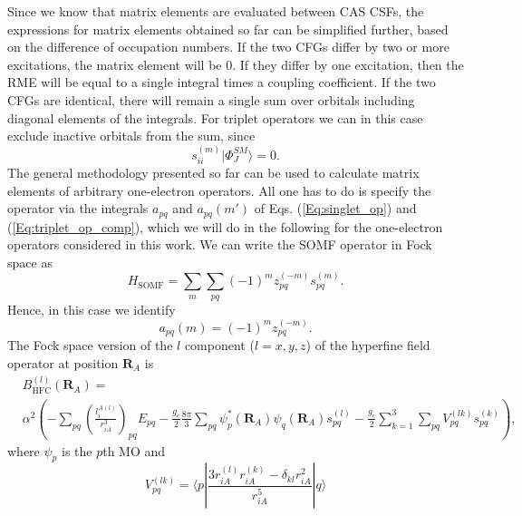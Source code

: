 Since we know that matrix elements are evaluated between CAS CSFs, the expressions for matrix elements obtained so far can be simplified further, based on the difference of occupation numbers. If the two CFGs differ by two or more excitations, the matrix element will be 0. If they differ by one excitation, then the RME will be equal to a single integral times a coupling coefficient. If the two CFGs are identical, there will remain a single sum over orbitals including diagonal elements of the integrals. For triplet operators we can in this case exclude inactive orbitals from the sum, since
	\begin{equation}s_{ii}^{(m)}|\Phi _J^{SM}\rangle  = 0.
	\end{equation} 	
The general methodology presented so far can be used to calculate matrix elements of arbitrary one-electron operators. All one has to do is specify the operator via the integrals ${a_{pq}}$ and ${a_{pq}}(m')$ of Eqs. (\ref{Eq:singlet_op}) and (\ref{Eq:triplet_op_comp}), which we will do in the following for the one-electron operators considered in this work.
We can write the SOMF operator in Fock space as
	\begin{equation}{H_{{\text{SOMF}}}} = \sum\limits_m {\sum\limits_{pq} {{{( - 1)}^m}z_{pq}^{( - m)}} } s_{pq}^{(m)}.
	\end{equation}	
Hence, in this case we identify
	\begin{equation}
	\label{Eq:integral_SOC}
	{a_{pq}}(m) = {( - 1)^m}z_{pq}^{( - m)}.
	\end{equation} 	
The Fock space version of the $l$ component ($l = x,y,z$) of the hyperfine field operator at position ${{\mathbf{R}}_A}$ is
	\begin{equation}
	\begin{aligned}
	&B_{{\text{HFC}}}^{(l)}({{\mathbf{R}}_A}) = \\
	&{\alpha ^2}\left( { - \sum\limits_{pq} {{{\left( {\frac{{l_i^{A(l)}}}{{r_{iA}^3}}} \right)}_{pq}}} {E_{pq}} - \frac{{{g_e}}}{2}\frac{{8\pi }}{3}\sum\limits_{pq} {\psi _p^ * } ({{\mathbf{R}}_A}){\psi _q}({{\mathbf{R}}_A})s_{pq}^{(l)} - \frac{{{g_e}}}{2}\sum\limits_{k = 1}^3 {\sum\limits_{pq} {V_{pq}^{(lk)}} } s_{pq}^{(k)}} \right),
	\end{aligned}
	\end{equation} 	
where ${\psi _p}$ is the $p$th MO and 
	\begin{equation}V_{pq}^{(lk)} = \langle p|\frac{{3r_{iA}^{(l)}r_{iA}^{(k)} - {\delta _{kl}}r_{iA}^2}}{{r_{iA}^5}}|q\rangle 
	\end{equation} 	
